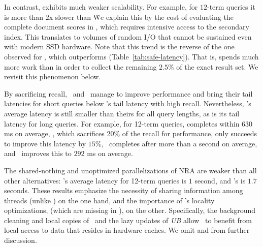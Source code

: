 {{In contrast, \pRA\/ exhibits much weaker scalability. For example, for $12$-term queries it is more than $2$x slower than \alg\. 
We explain this by the cost of evaluating the complete 
document scores in \pRA, which requires intensive access to the secondary index. This translates to volumes of random 
I/O that cannot be sustained even with modern SSD hardware. Note that this trend is the reverse of the one observed for \pRA\ex, 
which outperforms \alg\ex\/ (Table~\ref{tab:safe-latency}). That is, \alg\/ spends much more work than \pRA\/ 
in order to collect the remaining $2.5\%$ of the exact result set. We revisit this phenomenon  below. 


By sacrificing recall, \pBMW\ and \pJASS\ manage to improve performance and bring their tail latencies for short queries below \alg's tail latency with high recall. Nevertheless, \alg's average latency is still smaller than theirs for all query lengths, as is its tail latency for long queries.
For example, for 12-term queries, 
\pBMW\hi\/ completes  within $630$ ms on average, 
\pBMW\lo, 
which sacrifices $20\%$ of the recall for performance, only succeeds to improve this latency by $15\%$, 
\pJASS\hi\ completes  after more than a second on average, and \pJASS\lo\ improves this to $292$ ms on average.

The shared-nothing and unoptimized parallelizations of NRA are weaker than all other alternatives:
\pNRA's  average latency for 12-term queries is $1$ second, and \sNRA's is $1.7$ seconds. 
These results emphasize the necessity of sharing information among threads (unlike \sNRA) on the one hand,
and the importance of \alg's locality optimizations, (which are missing in \pNRA), on the other. 
Specifically, the background cleaning and local copies of \DMap\ and the lazy updates of \emph{UB} allow \alg\ to benefit from 
local access to data that resides in hardware caches. 
We omit \pNRA\/ and \sNRA\/ from further discussion. 

}}
